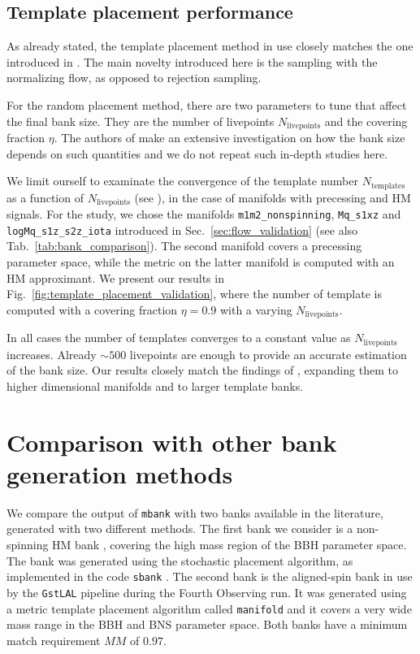 \documentclass[twocolumn,showpacs,preprintnumbers,nofootinbib,prd,
superscriptaddress,10pt]{revtex4-2}
\begin{document}
\subsection{Template placement performance} \label{sec:template_placement}

As already stated, the template placement method in use closely matches the one introduced in \cite{Coogan:2022qxs}.
The main novelty introduced here is the sampling with the normalizing flow, as opposed to rejection sampling.

For the random placement method, there are two parameters to tune that affect the final bank size. They are the number of livepoints $N_\text{livepoints}$ and the covering fraction $\eta$.
The authors of \cite{Coogan:2022qxs} make an extensive investigation on how the bank size depends on such quantities and we do not repeat such in-depth studies here.

We limit ourself to examinate the convergence of the template number $N_\text{templates}$ as a function of $N_\text{livepoints}$ (see \cite[Fig.~4 (right)]{Coogan:2022qxs}), in the case of manifolds with precessing and HM signals.
For the study, we chose the manifolds \texttt{m1m2\_nonspinning}, \texttt{Mq\_s1xz} and \texttt{logMq\_s1z\_s2z\_iota} introduced in Sec.~\ref{sec:flow_validation} (see also Tab.~\ref{tab:bank_comparison}). The second manifold covers a precessing parameter space, while the metric on the latter manifold is computed with an HM approximant.
We present our results in Fig.~\ref{fig:template_placement_validation}, where the number of template is computed with a covering fraction $\eta = 0.9$ with a varying $N_\text{livepoints}$.

In all cases the number of templates converges to a constant value as $N_\text{livepoints}$ increases. Already $\sim 500$ livepoints are enough to provide an accurate estimation of the bank size.
Our results closely match the findings of \cite{Coogan:2022qxs}, expanding them to higher dimensional manifolds and to larger template banks.

\section{Comparison with other bank generation methods} \label{sec:other_methods}

We compare the output of \texttt{mbank} with two banks available in the literature, generated with two different methods.
The first bank we consider is a non-spinning HM bank \cite{Harry:2017weg}, covering the high mass region of the BBH parameter space. The bank was generated using the stochastic placement algorithm, as implemented in the code \texttt{sbank} \cite{Ajith:2012mn}.
The second bank is the aligned-spin bank \cite{Sakon:2022ibh} in use by the \texttt{GstLAL} pipeline \cite{PhysRevD.95.042001, gstlal_paper2} during the Fourth Observing run. It was generated using a metric template placement algorithm called \texttt{manifold} \cite{Hanna:2022zpk} and it covers a very wide mass range in the BBH and BNS parameter space.
Both banks have a minimum match requirement $MM$ of $0.97$.
\end{document}
